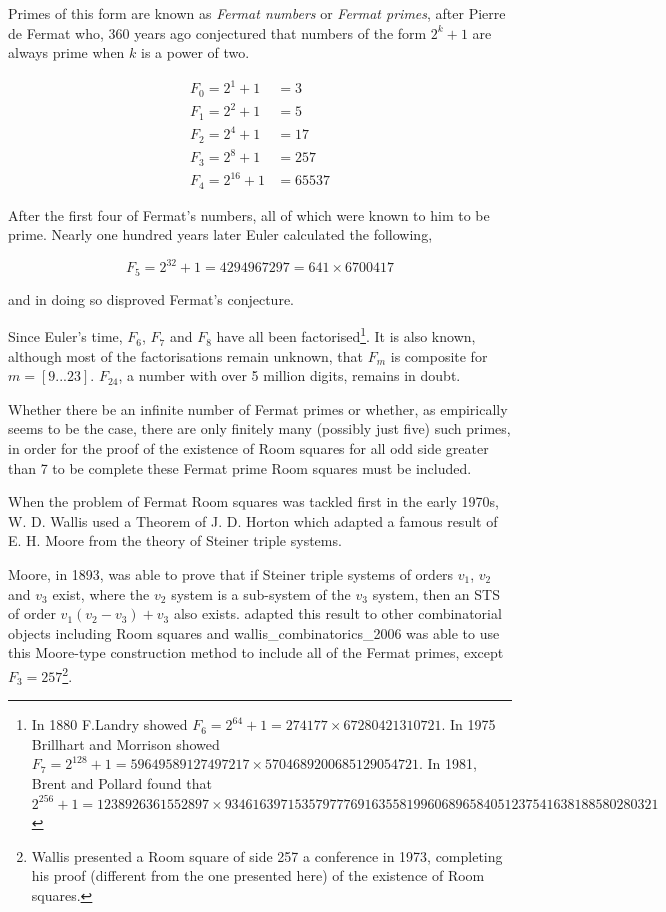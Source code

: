 \documentclass[
  11pt,
  a4paper]{book}
\begin{document}
Primes of this form are known as \emph{Fermat numbers} or \emph{Fermat
primes}, after Pierre de Fermat who, 360 years ago conjectured that
numbers of the form \(2^k + 1\) are always prime when \(k\) is a power
of two.

\begin{align*}
  F_0 = 2^1 + 1 &= 3 \\
  F_1 = 2^2 + 1 &= 5 \\
  F_2 = 2^4 + 1 &= 17 \\
  F_3 = 2^8 + 1 &= 257 \\
  F_4 = 2^{16} + 1 &= 65537
\end{align*}

After the first four of Fermat's numbers, all of which were known to him
to be prime. Nearly one hundred years later Euler calculated the
following,

\begin{equation}
F_5 = 2^{32}+1 = 4294967297 = 641\times 6700417
\end{equation}

and in doing so disproved Fermat's conjecture.

Since Euler's time, \(F_6\), \(F_7\) and \(F_8\) have all been
factorised\footnote{In 1880 F.Landry showed
  \(F_6=2^{64}+1=274177 \times 67280421310721\). In 1975 Brillhart and
  Morrison showed
  \(F_7=2^{128}+1=59649589127497217 \times 5704689200685129054721\). In
  1981, Brent and Pollard found that\\
  \(2^{256}+1=1238926361552897 \times 93461639715357977769163558199606896584051237541638188580280321\)}.
It is also known, although most of the factorisations remain unknown,
that \(F_m\) is composite for \(m = [9...23]\). \(F_{24}\), a number
with over 5 million digits, remains in doubt.

Whether there be an infinite number of Fermat primes or whether, as
empirically seems to be the case, there are only finitely many (possibly
just five) such primes, in order for the proof of the existence of Room
squares for all odd side greater than 7 to be complete these Fermat
prime Room squares must be included.

When the problem of Fermat Room squares was tackled first in the early
1970s, W. D. Wallis used a Theorem of J. D. Horton which adapted a
famous result of E. H. Moore from the theory of Steiner triple systems.

Moore, in 1893, was able to prove that if Steiner triple systems of
orders \(v_1\), \(v_2\) and \(v_3\) exist, where the \(v_2\) system is a
sub-system of the \(v_3\) system, then an STS of order
\(v_1(v_2 - v_3) + v_3\) also exists. \textcite{horton_variations_1970}
adapted this result to other combinatorial objects including Room
squares and wallis\_combinatorics\_2006 was able to use this Moore-type
construction method to include all of the Fermat primes, except
\(F_3 = 257\)\footnote{Wallis presented a Room square of side 257 a
  conference in 1973, completing his proof (different from the one
  presented here) of the existence of Room squares.}.
\end{document}
